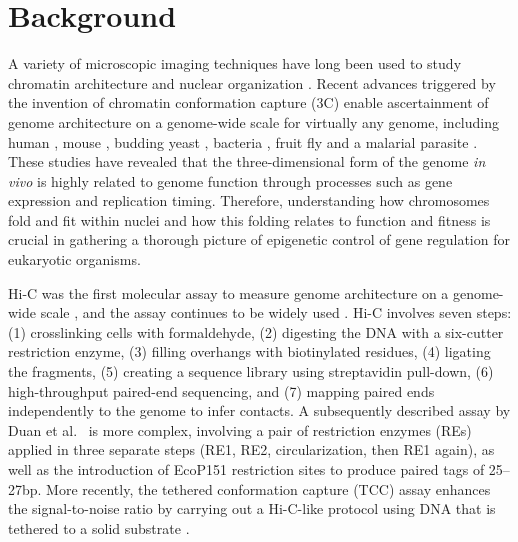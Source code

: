 \begin{abstract}{Abstract}
\textbf{Conclusion:} TM3C is a simple protocol for ascertaining genome
architecture and can be used to identify simultaneous contacts among three
or four loci. Application of TM3C to a near-haploid human cell line
revealed large-scale features of chromosomal organization and multi-way
chromatin contacts that preferentially link regions of open chromatin.

\textbf{Keywords:} genome architecture, chromatin conformation capture,
multi-locus chromatin contacts, near-haploid human cells, leukemia,
three-dimensional modeling.

\end{abstract}

\section*{Background}

A variety of microscopic imaging techniques have long been used to study
chromatin architecture and nuclear organization
\cite{langer-safer:immunological, manders:four-dimensional,
cremer:multicolor}. Recent advances triggered by the invention of chromatin
conformation capture (3C) enable ascertainment of genome architecture on a
genome-wide scale for virtually any genome, including human
\cite{lieberman-aiden:comprehensive, dixon:topological, jin:high-resolution},
mouse \cite{zhang:spatial, dixon:topological}, budding yeast
\cite{duan:three}, bacteria \cite{umbarger:three-dimensional}, fruit fly
\cite{sexton:three-dimensional} and a malarial parasite
\cite{ay:three-dimensional}. These studies have revealed that the
three-dimensional form of the genome {\em in vivo} is highly related to genome
function through processes such as gene expression and replication timing.
Therefore, understanding how chromosomes fold and fit within nuclei and how
this folding relates to function and fitness is crucial in gathering a
thorough picture of epigenetic control of gene regulation for eukaryotic
organisms.


Hi-C was the first molecular assay to measure genome architecture on a genome-wide
scale \cite{lieberman-aiden:comprehensive}, and the assay continues to
be widely used \cite{jin:high-resolution, naumova:organization, ay:three-dimensional}.
Hi-C involves seven steps: (1) crosslinking cells with
formaldehyde, (2) digesting the DNA with a six-cutter restriction enzyme, (3)
filling overhangs with biotinylated residues, (4) ligating the fragments, (5)
creating a sequence library using streptavidin pull-down, (6) high-throughput
paired-end sequencing, and (7) mapping paired ends independently to the genome
to infer contacts. A subsequently described assay by Duan et al.~\cite{duan:three} is more
complex, involving a pair of restriction enzymes (REs) applied in three separate
steps (RE1, RE2, circularization, then RE1 again), as well as the introduction
of EcoP151 restriction sites to produce paired tags of 25--27bp. More recently,
the tethered conformation capture (TCC) assay enhances the signal-to-noise
ratio by carrying out a Hi-C-like protocol using DNA that is tethered to a
solid substrate \cite{kalhor:genome}.

